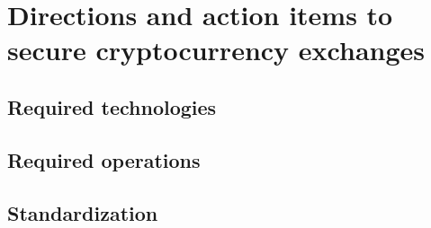 \section{Directions and action items to secure cryptocurrency exchanges}
\subsection{Required technologies}
\subsection{Required operations}
\subsection{Standardization}
